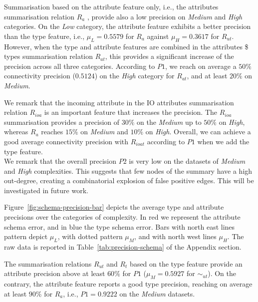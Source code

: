 Summarisation based on the attribute feature only, i.e., the attributes summarisation relation $R_a$ , provide also a low precision on \emph{Medium} and \emph{High} categories. On the \emph{Low} category, the attribute feature exhibits a better precision than the type feature, i.e., $\mu_L=0.5579$ for $R_a$ against $\mu_H=0.3617$ for $R_{ut}$. However, when the type and attribute features are combined in the attributes \$ types summarisation relation $R_{at}$, this provides a significant increase of the precision across all three categories. According to $P1$, we reach on average a $50\%$ connectivity precision ($0.5124$) on the \emph{High} category for $R_{at}$, and at least $20\%$ on \emph{Medium}.

We remark that the incoming attribute in the IO attributes summarisation relation $R_{ioa}$ is an important feature that increases the precision. The $R_{ioa}$ summarisation provides a precision of $30\%$ on the \emph{Medium} up to $50\%$ on \emph{High}, whereas $R_a$ reaches $15\%$ on \emph{Medium} and $10\%$ on \emph{High}. Overall, we can achieve a good average connectivity precision with $R_{ioat}$ according to $P1$ when we add the type feature.\\

We remark that the overall precision $P2$ is very low on the datasets of \emph{Medium} and \emph{High} complexities. This suggests that few nodes of the summary have a high out-degree, creating a combinatorial explosion of false positive edges. This will be investigated in future work.




Figure~\ref{fig:schema-precision-bar} depicts the average type and attribute precisions over the categories of complexity.
In red we represent the attribute schema error, and in blue the type schema error. Bars with north east lines pattern depict $\mu_{L}$, with dotted pattern $\mu_{M}$, and with north west lines $\mu_{H}$.
The raw data is reported in Table~\ref{tab:precision-schema} of the Appendix section.

The summarisation relations $R_{ut}$ and $R_t$ based on the type feature provide an attribute precision above at least $60\%$ for $P1$ ($\mu_M=0.5927$ for $\sim_{ut}$).
On the contrary, the attribute feature reports a good type precision, reaching on average at least $90\%$ for $R_a$, i.e., $P1=0.9222$ on the \emph{Medium} datasets.

